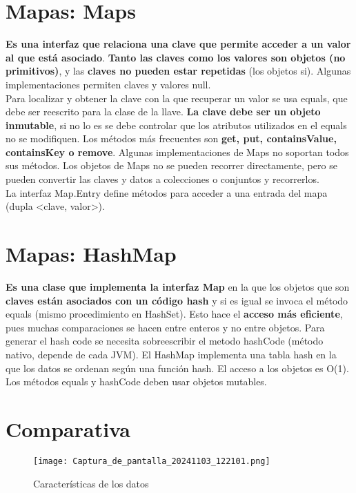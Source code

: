 \documentclass{article}
\begin{document}
\section{Mapas: Maps}
\textbf{Es una interfaz que relaciona una clave que permite acceder a un valor al que está asociado}. \textbf{Tanto las claves como los valores son objetos (no primitivos)}, y las \textbf{claves no pueden estar repetidas} (los objetos si). Algunas implementaciones permiten claves y valores null. \\
Para localizar y obtener la clave con la que recuperar un valor se usa equals, que debe ser reescrito para la clase de la llave. \textbf{La clave debe ser un objeto inmutable}, si no lo es se debe controlar que los atributos utilizados en el equals no se modifiquen. Los métodos más frecuentes son \textbf{get, put, containsValue, containsKey o remove}. Algunas implementaciones de Maps no soportan todos sus métodos. Los objetos de Maps no se pueden recorrer directamente, pero se pueden convertir las claves y datos a colecciones o conjuntos y recorrerlos. \\
La interfaz Map.Entry define métodos para acceder a una entrada del mapa (dupla <clave, valor>).

\section{Mapas: HashMap}
\textbf{Es una clase que implementa la interfaz Map} en la que los objetos que son \textbf{claves están asociados con un código hash} y si es igual se invoca el método equals (mismo procedimiento en HashSet). Esto hace el \textbf{acceso más eficiente}, pues muchas comparaciones se hacen entre enteros y no entre objetos. Para generar el hash code se necesita sobreescribir el metodo hashCode (método nativo, depende de cada JVM). El HashMap implementa una tabla hash en la que los datos se ordenan según una función hash. El acceso a los objetos es O(1). \\
Los métodos equals y hashCode deben usar objetos mutables.

\newpage

\section{Comparativa}
\begin{figure}[h]
    \centering
    \texttt{[image: Captura\_de\_pantalla\_20241103\_122101.png]}
    \caption{Características de los datos}
    \label{fig:etiqueta}
\end{figure}
\end{document}
